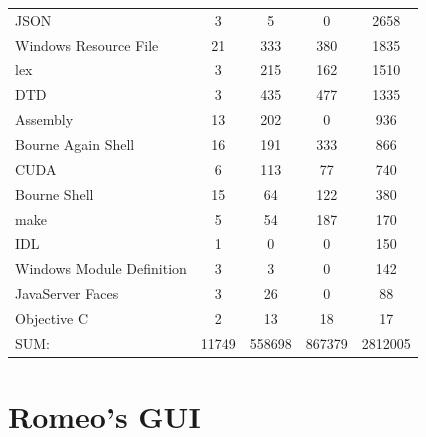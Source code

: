 \begin{appendix}
\begin{table}[htbp]
\begin{longtable}{ l|c|c|c|c }
        JSON                                  &   3         &     5         &     0        &   2658\\
        Windows Resource File                 &  21         &   333         &   380        &   1835\\
        lex                                   &   3         &   215         &   162        &   1510\\
        DTD                                   &   3         &   435         &   477        &   1335\\
        Assembly                              &  13         &   202         &     0        &    936\\
        Bourne Again Shell                    &  16         &   191         &   333        &    866\\
        CUDA                                  &   6         &   113         &    77        &    740\\
        Bourne Shell                          &  15         &    64         &   122        &    380\\
        make                                  &   5         &    54         &   187        &    170\\
        IDL                                   &   1         &     0         &     0        &    150\\
        Windows Module Definition             &   3         &     3         &     0        &    142\\
        JavaServer Faces                      &   3         &    26         &     0        &     88\\
        Objective C                           &   2         &    13         &    18        &     17\\
        \hline
        SUM:                                 &11749         &558698         &867379        &2812005\\
        \hline
    \end{longtable}
    \normalfont
    \label{table:VTKStatistic}
\end{table}

\section{Romeo's GUI}


\end{appendix}
